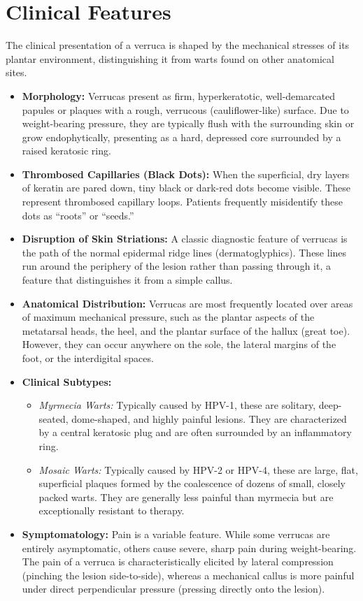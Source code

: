 \section*{Clinical Features}
The clinical presentation of a verruca is shaped by the mechanical stresses of its plantar environment, distinguishing it from warts found on other anatomical sites.
\begin{itemize}
    \item \textbf{Morphology:} Verrucas present as firm, hyperkeratotic, well-demarcated papules or plaques with a rough, verrucous (cauliflower-like) surface. Due to weight-bearing pressure, they are typically flush with the surrounding skin or grow endophytically, presenting as a hard, depressed core surrounded by a raised keratosic ring.
    \item \textbf{Thrombosed Capillaries (Black Dots):} When the superficial, dry layers of keratin are pared down, tiny black or dark-red dots become visible. These represent thrombosed capillary loops. Patients frequently misidentify these dots as ``roots'' or ``seeds.''
    \item \textbf{Disruption of Skin Striations:} A classic diagnostic feature of verrucas is the path of the normal epidermal ridge lines (dermatoglyphics). These lines run around the periphery of the lesion rather than passing through it, a feature that distinguishes it from a simple callus.
    \item \textbf{Anatomical Distribution:} Verrucas are most frequently located over areas of maximum mechanical pressure, such as the plantar aspects of the metatarsal heads, the heel, and the plantar surface of the hallux (great toe). However, they can occur anywhere on the sole, the lateral margins of the foot, or the interdigital spaces.
    \item \textbf{Clinical Subtypes:}
    \begin{itemize}
        \item \textit{Myrmecia Warts:} Typically caused by HPV-1, these are solitary, deep-seated, dome-shaped, and highly painful lesions. They are characterized by a central keratosic plug and are often surrounded by an inflammatory ring.
        \item \textit{Mosaic Warts:} Typically caused by HPV-2 or HPV-4, these are large, flat, superficial plaques formed by the coalescence of dozens of small, closely packed warts. They are generally less painful than myrmecia but are exceptionally resistant to therapy.
    \end{itemize}
    \item \textbf{Symptomatology:} Pain is a variable feature. While some verrucas are entirely asymptomatic, others cause severe, sharp pain during weight-bearing. The pain of a verruca is characteristically elicited by lateral compression (pinching the lesion side-to-side), whereas a mechanical callus is more painful under direct perpendicular pressure (pressing directly onto the lesion).
\end{itemize}


